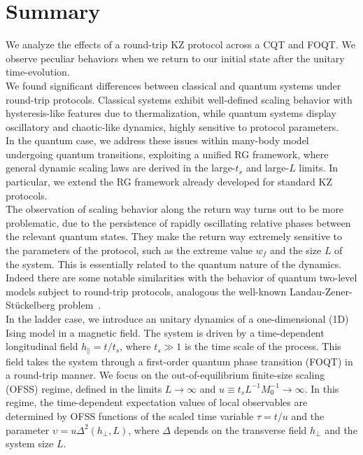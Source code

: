 

\section{Summary}

We analyze the effects of a round-trip KZ protocol across 
a CQT and FOQT. We observe peculiar behaviors when 
we return to our initial state after the unitary 
time-evolution.\\$ $\\
We found significant differences between classical and quantum systems under round-trip protocols. Classical systems exhibit well-defined scaling behavior with hysteresis-like features due to thermalization, while quantum systems display oscillatory and chaotic-like dynamics, highly sensitive to protocol parameters.\\$ $\\
In the quantum case, we address these issues within many-body model
undergoing quantum transitions, exploiting a
unified RG framework, where general dynamic scaling
laws are derived in the large-$t_s$ and large-$L$ limits. In particular,
we extend the RG framework already developed for standard KZ protocols.\\$ $\\
The observation of 
scaling behavior along the return way turns out to be more
problematic, due to the persistence of rapidly 
oscillating relative phases between the relevant quantum states.
They make the return way extremely sensitive to the 
parameters of the protocol, such as the extreme value $w_f$
and the size $L$ of the system. This is essentially related
to the quantum nature of the dynamics. Indeed there are
some notable similarities with the behavior of quantum
two-level models subject to round-trip protocols, 
analogous the well-known Landau-Zener-Stückelberg problem~\cite{tarantelli2022out}.\\$ $\\
In the ladder case, we introduce an unitary dynamics of a one-dimensional (1D) Ising model in a magnetic field. The system is driven by a time-dependent longitudinal field \( h_\parallel = t/t_s \), where \( t_s \gg 1 \) is the time scale of the process. This field takes the system through a first-order quantum phase transition (FOQT) in a round-trip manner. We focus on the out-of-equilibrium finite-size scaling (OFSS) regime, defined in the limits \( L \to \infty \) and \( u \equiv t_s L^{-1} M_0^{-1} \to \infty \). In this regime, the time-dependent expectation values of local observables are determined by OFSS functions of the scaled time variable \( \tau = t/u \) and the parameter \( \upsilon = u\Delta^2(h_\perp, L) \), where \( \Delta \) depends on the transverse field \( h_\perp \) and the system size \( L \).
